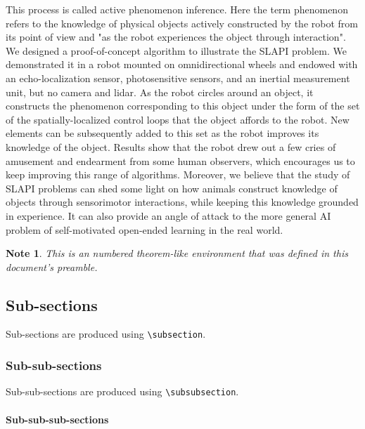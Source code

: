 \documentclass[pmlr]{jmlr}%
\newtheorem*{note}{Note}
\begin{document}
This process is called active phenomenon inference. 
Here the term phenomenon refers to the knowledge of physical objects actively constructed by the robot from its point of view and "as the robot experiences the object through interaction". 
We designed a proof-of-concept algorithm to illustrate the SLAPI problem. 
We demonstrated it in a robot mounted on omnidirectional wheels and endowed with an echo-localization sensor, photosensitive sensors, and an inertial measurement unit, but no camera and lidar. 
As the robot circles around an object, it constructs the phenomenon corresponding to this object under the form of the set of the spatially-localized control loops that the object affords to the robot. 
New elements can be subsequently added to this set as the robot improves its knowledge of the object. 
Results show that the robot drew out a few cries of amusement and endearment from some human observers, which encourages us to keep improving this range of algorithms. 
Moreover, we believe that the study of SLAPI problems can shed some light on how animals construct knowledge of objects through sensorimotor interactions, while keeping this knowledge grounded in experience. 
It can also provide an angle of attack to the more general AI problem of self-motivated open-ended learning in the real world.

\begin{note}
This is an numbered theorem-like environment that was defined in
this document's preamble.
\end{note}

\subsection{Sub-sections}

Sub-sections are produced using \verb|\subsection|.

\subsubsection{Sub-sub-sections}

Sub-sub-sections are produced using \verb|\subsubsection|.

\paragraph{Sub-sub-sub-sections}
\end{document}
